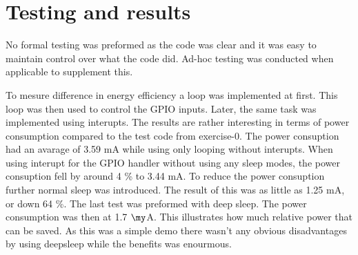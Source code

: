 \section{Testing and results}
No formal testing was preformed as the code was clear and it was easy to maintain control over what the code did.
Ad-hoc testing was conducted when applicable to supplement this.

To mesure difference in energy efficiency a loop was implemented at first. 
This loop was then used to control the GPIO inputs. Later, the same task was implemented using interupts.
The results are rather interesting in terms of power consumption compared to the test code from exercise-0.
The power consuption had an avarage of 3.59 mA while using only looping without interupts. 
When using interupt for the GPIO handler without using any sleep modes, the power consuption fell by around 4 \% to 3.44 mA.
To reduce the power consuption further normal sleep was introduced. The result of this was as little as 1.25 mA, or down 64 \%.
The last test was preformed with deep sleep. The power consumption was then at 1.7 $\my$A. 
This illustrates how much relative power that can be saved. 
As this was a simple demo there wasn't any obvious disadvantages by using deepsleep while the benefits was enourmous.
